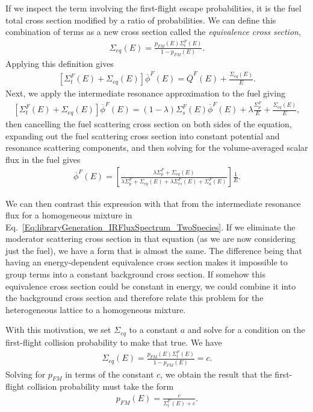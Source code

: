 If we inspect the term involving the first-flight escape probabilities, it is the fuel total cross section modified by a ratio of probabilities. We can define this combination of terms as a new cross section called the \emph{equivalence cross section},
\begin{align}
  \Sigma_{eq}(E) = \frac{ p_{FM}(E) \Sigma_t^F(E) }{ 1 - p_{FM}(E) } .
\end{align}
Applying this definition gives
\begin{align}
  \left[ \Sigma_t^F(E) + \Sigma_{eq}(E) \right] \overline{\phi}^F(E) =  \overline{Q}^F(E) + \frac{\Sigma_{eq}(E)}{E} .
\end{align}
Next, we apply the intermediate resonance approximation to the fuel giving
\begin{align}
  \left[ \Sigma_t^F(E) + \Sigma_{eq}(E) \right] \overline{\phi}^F(E) =  ( 1 - \lambda ) \Sigma_s^F(E) \overline{\phi}^F(E) + \lambda \frac{\Sigma_p^F}{E} + \frac{\Sigma_{eq}(E)}{E} , \label{Eq:libraryGeneration_firstFlightCollisionProbabilityEquation_equivalenceXS}
\end{align}
then cancelling the fuel scattering cross section on both sides of the equation, expanding out the fuel scattering cross section into constant potential and resonance scattering components, and then solving for the volume-averaged scalar flux in the fuel gives
\begin{align}
   \overline{\phi}^F(E) = \left[ \frac{ \lambda \Sigma_p^F + \Sigma_{eq}(E) }{ \lambda \Sigma_p^F + \Sigma_{eq}(E) + \lambda \Sigma_{rs}^F(E) +  \Sigma_a^F(E) } \right] \frac{1}{E} . \label{Eq:libraryGeneration_fluxSpectrumFuel_equivalenceXS}
\end{align}

We can then contrast this expression with that from the intermediate resonance flux for a homogeneous mixture in Eq.~\eqref{Eq:libraryGeneration_IRFluxSpectrum_TwoSpecies}. If we eliminate the moderator scattering cross section in that equation (as we are now considering just the fuel), we have a form that is almost the same. The difference being that having an energy-dependent equivalence cross section makes it impossible to group terms into a constant background cross section. If somehow this equivalence cross section could be constant in energy, we could combine it into the background cross section and therefore relate this problem for the heterogeneous lattice to a homogeneous mixture.

With this motivation, we set $\Sigma_{eq}$ to a constant $a$ and solve for a condition on the first-flight collision probability to make that true. We have
\begin{align}
  \Sigma_{eq}(E) = \frac{ p_{FM}(E) \Sigma_t^F(E) }{ 1 - p_{FM}(E) } = c .
\end{align}
Solving for $p_{FM}$ in terms of the constant $c$, we obtain the result that the first-flight collision probability must take the form
\begin{align}
  p_{FM}(E) = \frac{ c }{ \Sigma_t^F(E) + c } . \label{Eq:libraryGeneration_firstFlightCollisionProbability_oneTermRationalForm}
\end{align}

